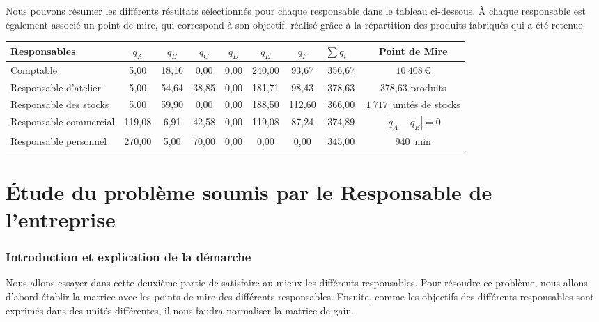 \documentclass[paper=a4, fontsize=11pt]{report}
\numberwithin{equation}{section}		%
\numberwithin{figure}{section}			%
\numberwithin{table}{section}				%
\newcommand\abs[1]{\left|#1\right|}
\begin{document}
Nous pouvons résumer les différents résultats sélectionnés pour chaque responsable dans le tableau ci-dessous. À chaque responsable est également associé un point de mire, qui correspond à son objectif, réalisé grâce à la répartition des produits fabriqués qui a été retenue.

\begin{center}
\begin{tabular}{l|cccccc|cc}
\hline
Responsables & $q_A$ & $q_B$ & $q_C$ & $q_D$ & $q_E$ & $q_F$ & $\sum q_i \quad$ & Point de Mire \\
\hline
Comptable & 5,00 & 18,16 & 0,00 & 0,00 & 240,00 & 93,67 & 356,67 & $10 \:408\,$€\\
Responsable d'atelier & 5,00 & 54,64 & 38,85 & 0,00 & 181,71 & 98,43 & 378,63 & 378,63 produits\\
Responsable des stocks & 5.00 & 59,90 & 0,00 & 0,00 & 188,50 & 112,60 & 366,00 & $1\:717\,$ unités de stocks\\
Responsable commercial & 119,08 & 6,91 & 42,58 & 0,00 & 119,08 & 87,24 & 374,89 & $\abs{q_A - q_E}=0$\\
Responsable personnel & 270,00 & 5,00 & 70,00 & 0,00 & 0,00 & 0,00 & 345,00 & $940\,$ min \\

\hline
\end{tabular}
\end{center}
\part{\'Etude du problème soumis par le Responsable de l'entreprise}
\setcounter{section}{0}

\section{Introduction et explication de la démarche}

Nous allons essayer dans cette deuxième partie de satisfaire au mieux les différents responsables. Pour résoudre ce problème, nous allons d'abord établir la matrice avec les points de mire des différents responsables. Ensuite, comme les objectifs des différents responsables sont exprimés dans des unités différentes, il nous faudra normaliser la matrice de gain.
\end{document}
